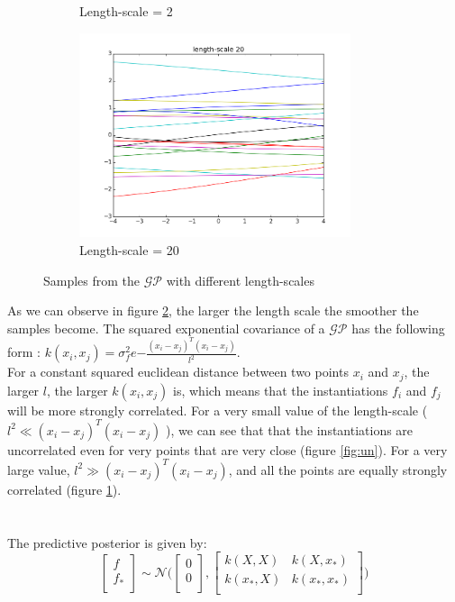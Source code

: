 \documentclass[a4paper,11pt]{article}
\theoremstyle{mytheor}
\begin{document}
\begin{figure}[h]
\begin{subfigure}{0.5\textwidth}
\caption{Length-scale = 2}
\end{subfigure}
\begin{subfigure}{0.5\textwidth}
\includegraphics[width=\linewidth, height=6cm]{lbig}
\caption{Length-scale = 20}
\label{fig:cor}
\end{subfigure}
\caption{Samples from the $\mathcal{GP}$ with different length-scales}
\label{fig:lengthscale}
\end{figure}
As we can observe in figure \ref{fig:lengthscale}, the larger the length scale the smoother the samples become.
The squared exponential covariance of a $\mathcal{GP}$ has the following form : $k(x_i, x_j) = \sigma^2_f e{-\frac{(x_i-x_j)^T(x_i-x_j)}{l^2}}$.\\For a constant squared euclidean distance between two points $x_i$ and $x_j$, the larger $l$, the larger $k(x_i, x_j)$ is, which means that the instantiations $f_i$ and $f_j$ will be more strongly correlated. For a very small value of the length-scale ( $l^2 \ll (x_i-x_j)^T(x_i-x_j)$ ), we can see that that the instantiations are uncorrelated even for very points that are very close (figure \ref{fig:un}). For a very large value, $l^2 \gg (x_i-x_j)^T(x_i-x_j)$, and all the points are equally strongly correlated (figure \ref{fig:cor}).
\smallskip
\\\\
\smallskip
\\The predictive posterior is given by:
\begin{equation*}
    \begin{bmatrix}
     f \\
      f_* \\
     \end{bmatrix}
     \sim
     \mathcal{N} 
     \Bigg( 
     \begin{bmatrix}
     0 \\
     0 \\
     \end{bmatrix},
     \begin{bmatrix}
     k(X,X) & k(X,x_*) \\
     k(x_*, X) & k(x_*, x_*)\\
     \end{bmatrix}
     \Bigg)
\end{equation*}
\end{document}
